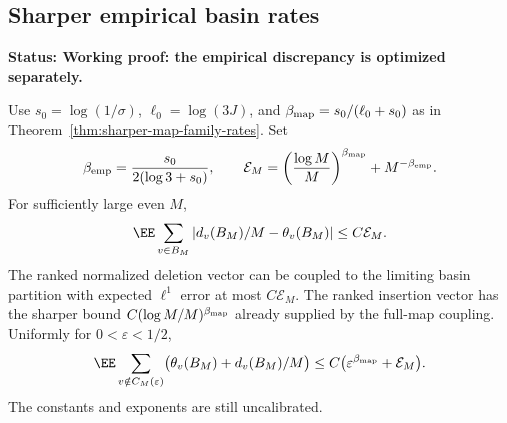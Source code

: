\documentclass[11pt,letterpaper]{article}
\newcommand{\status}[1]{\textbf{Status: #1.}}
\begin{document}
\subsection{Sharper empirical basin rates}
\label{sec:sharper-basin-rate}

\status{Working proof: the empirical discrepancy is optimized separately}

\begin{corollary}
\label{cor:sharper-basin-rate}
Use $s_0=\log(1/\sigma)$, $\ell_0=\log(3J)$, and
$\beta_{\rm map}=s_0/(\ell_0+s_0)$ as in
Theorem~\ref{thm:sharper-map-family-rates}. Set
\[
 \beta_{\rm emp}=\frac{s_0}{2(\log3+s_0)},\qquad
 \mathcal E_M=\left(\frac{\log M}{M}\right)^{\beta_{\rm map}}
                                        +M^{-\beta_{\rm emp}}.
\]
For sufficiently large even $M$,
\begin{equation}\label{eq:sharper-deletion-basin-rate}
 \EE\sum_{v\in B_M}|d_v(B_M)/M-\theta_v(B_M)|
                                      \le C\mathcal E_M.
\end{equation}
The ranked normalized deletion vector can be coupled to the
limiting basin partition with expected $\ell^1$ error at most
$C\mathcal E_M$. The ranked insertion vector has the sharper
bound $C(\log M/M)^{\beta_{\rm map}}$ already supplied by the
full-map coupling. Uniformly for $0<\varepsilon<1/2$,
\begin{equation}\label{eq:sharper-early-basin-rate}
 \EE\sum_{v\notin C_M(\varepsilon)}
       \bigl(\theta_v(B_M)+d_v(B_M)/M\bigr)
       \le C\bigl(\varepsilon^{\beta_{\rm map}}+\mathcal E_M\bigr).
\end{equation}
The constants and exponents are still uncalibrated.
\end{corollary}
\end{document}
